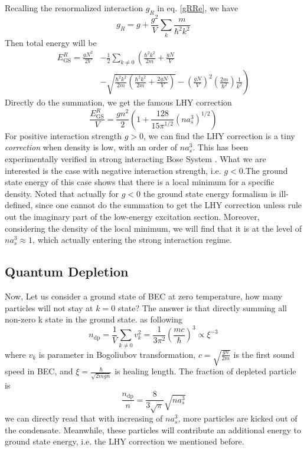 Recalling the renormalized interaction $g_R$ in eq. \ref{gRRe}, we have
\begin{equation}
g_R=g+\frac{g^2}{V}\sum _k \frac{m}{\hbar ^2k^2}
\end{equation}
Then total energy will be
\begin{equation}
\begin{split}
E_{\text{GS}}^R=\frac{gN^2}{2V}&-\frac{1}{2}\sum_{k\neq0}\left(\frac{\hbar ^2k^2}{2m}+\frac{gN}{V}\right.\\
&\left.-\sqrt{\frac{\hbar^2k^2}{2m}\left(\frac{\hbar^2k^2}{2m}+\frac{2gN}{V}\right)}-\left(\frac{gN}{V}\right)^2\left(\frac{2m}{\hbar ^2}\right)\frac{1}{k^2}\right)
\end{split}
\end{equation}
Directly do the summation, we get the famous LHY correction
\begin{equation}
\frac{E_{\text{GS}}^R}{V}=\frac{g n^2}{2}\left(1+\frac{128}{15\pi ^{1/2}} \left(n a_s^3\right)^{1/2}\right)
\end{equation}
For positive interaction strength $g>0$, we can find the LHY correction is a tiny \textit{correction} when density is low, with an order of $n a_s^3$. This has been experimentally verified in strong interacting Bose System \cite{Navon2011}. What we are interested is the case with negative interaction strength, i.e. $g<0$.The ground state energy of this case shows that there is a local minimum for a specific density. Noted that actually for $g<0$ the ground state energy formalism is ill-defined, since one cannot do the summation to get the LHY correction unless rule out the imaginary part of the low-energy excitation section. Moreover, considering the density of the local minimum, we will find that it is at the level of $n a_s^3 \approx 1$, which actually entering the strong interaction regime.

\subsection{Quantum Depletion}
Now, Let us consider a ground state of BEC at zero temperature, how many particles will not stay at $k=0$ state? The answer is that directly summing all non-zero k state in the ground state. as following
\begin{equation}
n_{\text{dp}}=\frac{1}{V}\sum _{k\neq 0} v_k^2=\frac{1}{3\pi ^2}\left(\frac{m c}{\hbar }\right)^3\propto \xi ^{-3}
\end{equation}
where $v_k$ is parameter in Bogoliubov transformation, $c =\sqrt{\frac{g n}{2m}}$ is the first sound speed in BEC, and $\xi =\frac{\hbar }{\sqrt{2m g n}}$ is healing length.
The fraction of depleted particle is
\begin{equation}
\frac{n_{\text{dp}}}{n}=\frac{8}{3\sqrt{\pi }}\sqrt{n a_s^3}
\end{equation}
we can directly read that with increasing of $n a_s^3$, more particles are kicked out of the condensate. Meanwhile, these particles will contribute an additional energy to ground state energy, i.e. the LHY correction we mentioned before.

